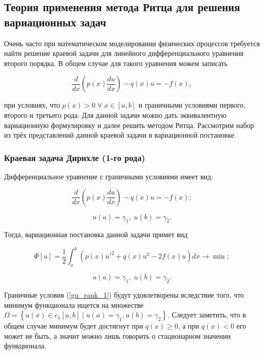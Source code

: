 \subsection{Теория применения метода Ритца для решения вариационных задач}

Очень часто при математическом моделировании физических процессов требуется найти решение краевой задачи для линейного дифференциального уравнения второго порядка. В общем случае для такого уравнения можем записать

\begin{equation}\label{ODE_rank_2}
	\frac{d }{dx} \left( p(x) \frac{du}{dx} \right) - q(x)u = -f(x),
\end{equation}

\noindent при условиях, что $p(x) > 0 \; \forall \; x \in \left[ a, b \right]$ и граничными условиями первого, второго и третьего рода. Для данной задачи можно дать эквивалентную вариационную формулировку и далее решить методом Ритца.
Рассмотрим набор из трёх представлений данной краевой задачи в вариационной постановке.

\subsubsection{Краевая задача Дирихле (1-го рода)}

Дифференциальное уравнение с граничными условиями имеет вид:

\begin{displaymath}
	\frac{d }{dx} \left( p(x) \frac{du}{dx} \right) - q(x)u = -f(x);
\end{displaymath}

\begin{equation} \label{gu_rank_1}
	u(a) = \gamma_{1}, \; u(b) = \gamma_{2}.
\end{equation}

\noindent Тогда, вариационная постановка данной задачи примет вид

\begin{displaymath}
	\Phi[u] = \frac{1}{2} \int_{a}^{b} \left( p(x)u'^{2} + q(x)u^{2} - 2f(x)u \right)dx \to \min;
\end{displaymath}

\begin{displaymath}
	u(a) = \gamma_{1}, \; u(b) = \gamma_{2}.
\end{displaymath}

Граничные условия (\ref{gu_rank_1}) будут удовлетворены вследствие того, что минимум функционала ищется на множестве $\Omega = \left\{ u(x) \in c_{1}\left[ a, b \right] \; | \; u(a)=\gamma_{1}, u(b)=\gamma_{2} \right\}$. Следует заметить, что в общем случае минимум будет достигнут при $q(x) \geq 0$, а при $q(x) < 0$ его может не быть, а значит можно лишь говорить о стационарном значении функционала.

